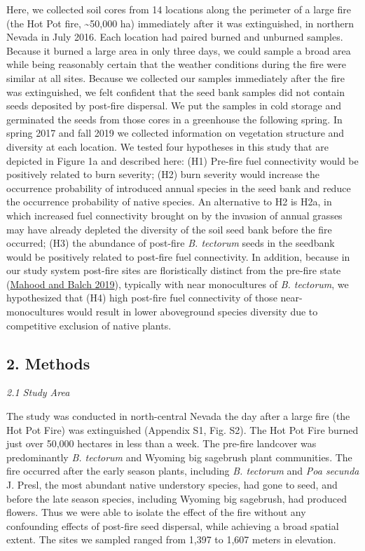 \documentclass[
  12pt,
]{article}
\begin{document}
Here, we collected soil cores from 14 locations along the perimeter of a
large fire (the Hot Pot fire, \textasciitilde50,000 ha) immediately
after it was extinguished, in northern Nevada in July 2016. Each
location had paired burned and unburned samples. Because it burned a
large area in only three days, we could sample a broad area while being
reasonably certain that the weather conditions during the fire were
similar at all sites. Because we collected our samples immediately after
the fire was extinguished, we felt confident that the seed bank samples
did not contain seeds deposited by post-fire dispersal. We put the
samples in cold storage and germinated the seeds from those cores in a
greenhouse the following spring. In spring 2017 and fall 2019 we
collected information on vegetation structure and diversity at each
location. We tested four hypotheses in this study that are depicted in
Figure 1a and described here: (H1) Pre-fire fuel connectivity would be
positively related to burn severity; (H2) burn severity would increase
the occurrence probability of introduced annual species in the seed bank
and reduce the occurrence probability of native species. An alternative
to H2 is H2a, in which increased fuel connectivity brought on by the
invasion of annual grasses may have already depleted the diversity of
the soil seed bank before the fire occurred; (H3) the abundance of
post-fire \emph{B. tectorum} seeds in the seedbank would be positively
related to post-fire fuel connectivity. In addition, because in our
study system post-fire sites are floristically distinct from the
pre-fire state (\protect\hyperlink{ref-Mahood2019}{Mahood and Balch
2019}), typically with near monocultures of \emph{B. tectorum}, we
hypothesized that (H4) high post-fire fuel connectivity of those
near-monocultures would result in lower aboveground species diversity
due to competitive exclusion of native plants.

\hypertarget{methods}{%
\subsection{2. Methods}\label{methods}}

\emph{2.1 Study Area}

The study was conducted in north-central Nevada the day after a large
fire (the Hot Pot Fire) was extinguished (Appendix S1, Fig. S2). The Hot
Pot Fire burned just over 50,000 hectares in less than a week. The
pre-fire landcover was predominantly \emph{B. tectorum} and Wyoming big
sagebrush plant communities. The fire occurred after the early season
plants, including \emph{B. tectorum} and \emph{Poa secunda} J. Presl,
the most abundant native understory species, had gone to seed, and
before the late season species, including Wyoming big sagebrush, had
produced flowers. Thus we were able to isolate the effect of the fire
without any confounding effects of post-fire seed dispersal, while
achieving a broad spatial extent. The sites we sampled ranged from 1,397
to 1,607 meters in elevation.
\end{document}
